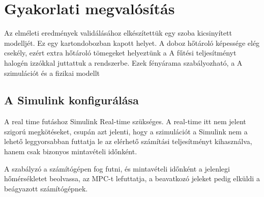 \chapter{Gyakorlati megvalósítás}

Az elméleti eredmények validálásához elkészítettük egy szoba kicsinyített modelljét. Ez egy kartondobozban kapott helyet. A doboz hőtároló képessége elég csekély, ezért extra hőtároló tömegeket helyeztünk a 
A fűtési teljesítményt halogén izzókkal juttattuk a rendszerbe. Ezek fényárama szabályozható, a 
A szimulációt és a fizikai modellt

\section{A Simulink konfigurálása}
A real time futáshoz Simulink  Real-time szükséges. A real-time itt nem jelent szigorú megkötéseket, csupán azt jelenti, hogy a szimulációt a Simulink nem a lehető leggyorsabban futtatja le az elérhető számítási teljesítményt kihasználva, hanem csak bizonyos mintavételi időnként. 


A szabályzó a számítógépen fog futni, és mintavételi időnként a jelenlegi hőmérsékletet beolvassa, az MPC-t lefuttatja, a beavatkozó jeleket pedig elküldi a beágyazott számítógépnek.

